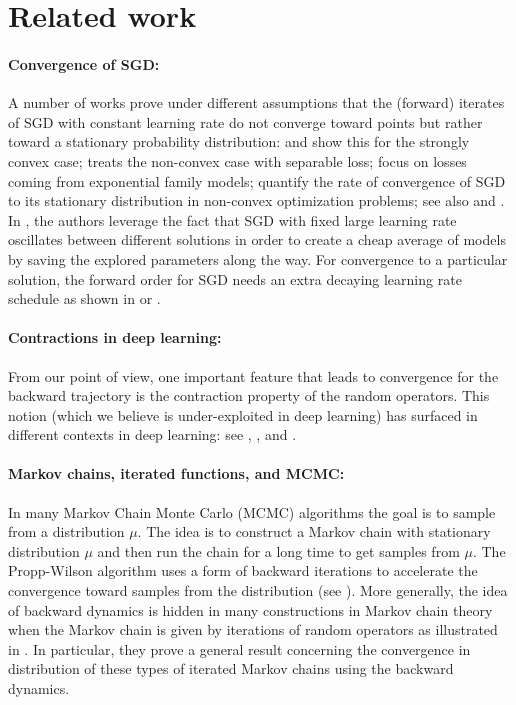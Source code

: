 \section{Related work}
\label{section:related_work}

\paragraph{Convergence of SGD:}
A number of works prove under different assumptions that the (forward) iterates of SGD with constant learning rate do not converge toward points but rather toward a stationary probability distribution: \cite{merad2023convergence} and \cite{dieuleveut2020bridging} show this for the strongly convex case; \cite{shirokoff2024convergencemarkovchainsconstant} treats the non-convex case with separable loss; \cite{babichev2018constantstepsizestochastic} focus on losses coming from exponential family models; \cite{cheng2020stochastic} quantify the rate of convergence of SGD to its stationary distribution in non-convex optimization problems; see also \cite{dieuleveut2016nonparametric} and \cite{meyn_tweedie_1993}. In \cite{huang2017snapshot}, the authors leverage the fact that SGD with fixed large learning rate oscillates between different solutions in order to create a cheap average of models by saving the explored parameters along the way. For convergence to a particular solution, the forward order for SGD needs an extra decaying learning rate schedule as shown in \cite{robbins1951a_stochastic} or \cite{mertikopoulos2020on}.

\paragraph{Contractions in deep learning:} 
From our point of view, one important feature that leads to convergence for the backward trajectory is the contraction property of the random operators. This notion (which we believe is under-exploited in deep learning) has surfaced in different contexts in deep learning: see \cite{BFGQ19}, \cite{QW19}, and \cite{AK22}. 

\paragraph{Markov chains, iterated functions, and MCMC:}
In many Markov Chain Monte Carlo (MCMC) algorithms the goal is to sample from a distribution $\mu$. The idea is to construct a Markov chain with stationary distribution $\mu$ and then run the chain for a long time to get samples from $\mu$. The Propp-Wilson algorithm uses a form of backward iterations to accelerate the convergence toward samples from the distribution (see \cite{propp1996exact}). More generally, the idea of backward dynamics is hidden in many constructions in Markov chain theory when the Markov chain is given by iterations of random operators as illustrated in \cite{diaconis1999iterated}. In particular, they prove a general result concerning the convergence in distribution of these types of iterated Markov chains using the backward dynamics.

